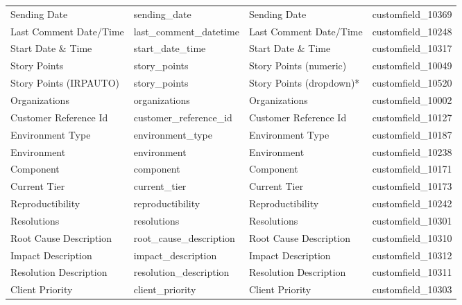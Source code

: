 \documentclass[12pt, a4paper]{article}
\begin{document}
\begin{longtable}{>{\small}p{3.6cm} >{\ttfamily\small}p{3.2cm} >{\small}p{3.0cm} >{\ttfamily\small}p{3.0cm}}
    Sending Date               & sending\_date              & Sending Date                 & customfield\_10369 \\
    Last Comment Date/Time     & last\_comment\_datetime    & Last Comment Date/Time       & customfield\_10248 \\
    Start Date \& Time         & start\_date\_time          & Start Date \& Time           & customfield\_10317 \\
    Story Points               & story\_points              & Story Points (numeric)       & customfield\_10049 \\
    Story Points (IRPAUTO)     & story\_points              & Story Points (dropdown)*     & customfield\_10520 \\
    Organizations              & organizations              & Organizations                & customfield\_10002 \\
    Customer Reference Id      & customer\_reference\_id    & Customer Reference Id        & customfield\_10127 \\
    Environment Type           & environment\_type          & Environment Type             & customfield\_10187 \\
    Environment                & environment                & Environment                  & customfield\_10238 \\
    Component                  & component                  & Component                    & customfield\_10171 \\
    Current Tier               & current\_tier              & Current Tier                 & customfield\_10173 \\
    Reproductibility           & reproductibility           & Reproductibility             & customfield\_10242 \\
    Resolutions                & resolutions                & Resolutions                  & customfield\_10301 \\
    Root Cause Description     & root\_cause\_description   & Root Cause Description       & customfield\_10310 \\
    Impact Description         & impact\_description        & Impact Description           & customfield\_10312 \\
    Resolution Description     & resolution\_description    & Resolution Description       & customfield\_10311 \\
    Client Priority            & client\_priority           & Client Priority              & customfield\_10303 \\

\end{longtable}
\end{document}
